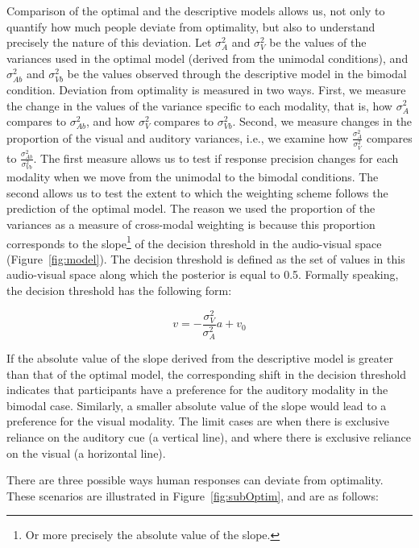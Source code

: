 \documentclass[english,floatsintext,man]{apa6}
\theoremstyle{definition}
\theoremstyle{definition}
\theoremstyle{definition}
\theoremstyle{remark}
\begin{document}
Comparison of the optimal and the descriptive models allows us, not only
to quantify how much people deviate from optimality, but also to
understand precisely the nature of this deviation. Let \(\sigma^2_{A}\)
and \(\sigma^2_{V}\) be the values of the variances used in the optimal
model (derived from the unimodal conditions), and \(\sigma^2_{Ab}\) and
\(\sigma^2_{Vb}\) be the values observed through the descriptive model
in the bimodal condition. Deviation from optimality is measured in two
ways. First, we measure the change in the values of the variance
specific to each modality, that is, how \(\sigma^2_{A}\) compares to
\(\sigma^2_{Ab}\), and how \(\sigma^2_{V}\) compares to
\(\sigma^2_{Vb}\). Second, we measure changes in the proportion of the
visual and auditory variances, i.e., we examine how
\(\frac{\sigma^2_{A}}{\sigma^2_{V}}\) compares to
\(\frac{\sigma^2_{Ab}}{\sigma^2_{Vb}}\). The first measure allows us to
test if response precision changes for each modality when we move from
the unimodal to the bimodal conditions. The second allows us to test the
extent to which the weighting scheme follows the prediction of the
optimal model. The reason we used the proportion of the variances as a
measure of cross-modal weighting is because this proportion corresponds
to the
slope\footnote{Or more precisely the absolute value of the slope.} of
the decision threshold in the audio-visual space
(Figure~\ref{fig:model}). The decision threshold is defined as the set
of values in this audio-visual space along which the posterior is equal
to 0.5. Formally speaking, the decision threshold has the following
form:

\[v=-\frac{\sigma^2_V}{\sigma^2_A}a+v_0\]

If the absolute value of the slope derived from the descriptive model is
greater than that of the optimal model, the corresponding shift in the
decision threshold indicates that participants have a preference for the
auditory modality in the bimodal case. Similarly, a smaller absolute
value of the slope would lead to a preference for the visual modality.
The limit cases are when there is exclusive reliance on the auditory cue
(a vertical line), and where there is exclusive reliance on the visual
(a horizontal line).

There are three possible ways human responses can deviate from
optimality. These scenarios are illustrated in
Figure~\ref{fig:subOptim}, and are as follows:
\end{document}
